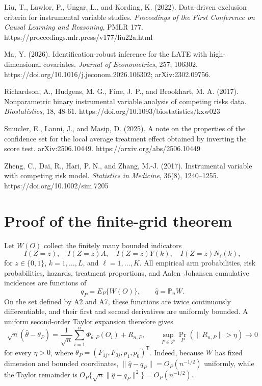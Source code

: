 \documentclass[
  10pt,
  letterpaper,
]{article}
\begin{document}
Liu, T., Lawlor, P., Ungar, L., and Kording, K. (2022). Data-driven
exclusion criteria for instrumental variable studies. \emph{Proceedings
of the First Conference on Causal Learning and Reasoning}, PMLR 177.
https://proceedings.mlr.press/v177/liu22a.html

Ma, Y. (2026). Identification-robust inference for the LATE with
high-dimensional covariates. \emph{Journal of Econometrics}, 257,
106302. https://doi.org/10.1016/j.jeconom.2026.106302; arXiv:2302.09756.

Richardson, A., Hudgens, M. G., Fine, J. P., and Brookhart, M. A.
(2017). Nonparametric binary instrumental variable analysis of competing
risks data. \emph{Biostatistics}, 18, 48-61.
https://doi.org/10.1093/biostatistics/kxw023

Smucler, E., Lanni, J., and Masip, D. (2025). A note on the properties
of the confidence set for the local average treatment effect obtained by
inverting the score test. arXiv:2506.10449.
https://arxiv.org/abs/2506.10449

Zheng, C., Dai, R., Hari, P. N., and Zhang, M.-J. (2017). Instrumental
variable with competing risk model. \emph{Statistics in Medicine},
36(8), 1240--1255. https://doi.org/10.1002/sim.7205

\appendix
\section{Proof of the finite-grid theorem}

Let $W(O)$ collect the finitely many bounded indicators
\[
I(Z=z),\quad I(Z=z)A,\quad
I(Z=z)Y(k),\quad I(Z=z)N_\ell(k),
\]
for $z\in\{0,1\}$, $k=1,\ldots,L$, and
$\ell=1,\ldots,K$. All empirical arm probabilities, risk probabilities,
hazards, treatment proportions, and Aalen--Johansen cumulative
incidences are functions of
\[
q_P=E_P\{W(O)\},\qquad \widehat q=\mathbb P_nW.
\]
On the set defined by A2 and A7, these functions are twice continuously
differentiable, and their first and second derivatives are uniformly
bounded. A uniform second-order Taylor expansion therefore gives
\[
\sqrt n(\widehat\theta-\theta_P)
=\frac{1}{\sqrt n}\sum_{i=1}^n\Phi_{\theta,P}(O_i)+R_{n,P},
\qquad
\sup_{P\in\mathcal P}\Pr_P(\|R_{n,P}\|>\eta)\longrightarrow0
\]
for every $\eta>0$, where
$\theta_P=(F_{1j},F_{0j},p_1,p_0)^\mathsf T$. Indeed, because $W$ has
fixed dimension and bounded coordinates,
$\|\widehat q-q_P\|=O_P(n^{-1/2})$ uniformly, while the Taylor remainder
is $O_P\{\sqrt n\|\widehat q-q_P\|^2\}=O_P(n^{-1/2})$.
\end{document}
